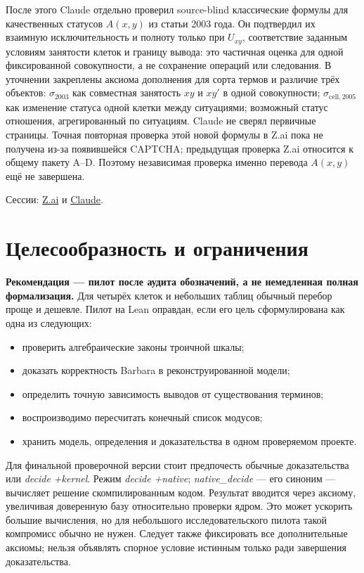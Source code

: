 \documentclass[12pt,a4paper]{article}
\begin{document}
После этого Claude отдельно проверил source-blind классические формулы для качественных статусов \(A(x,y)\) из статьи 2003 года. Он подтвердил их взаимную исключительность и полноту только при \(U_{xy}\), соответствие заданным условиям занятости клеток и границу вывода: это частичная оценка для одной фиксированной совокупности, а не сохранение операций или следования. В уточнении закреплены аксиома дополнения для сорта термов и различие трёх объектов: \(\sigma_{2003}\) как совместная занятость \(xy\) и \(xy'\) в одной совокупности; \(\sigma_{\mathrm{cell},2005}\) как изменение статуса одной клетки между ситуациями; возможный статус отношения, агрегированный по ситуациям. Claude не сверял первичные страницы. Точная повторная проверка этой новой формулы в Z.ai пока не получена из-за появившейся CAPTCHA; предыдущая проверка Z.ai относится к общему пакету A–D. Поэтому независимая проверка именно перевода \(A(x,y)\) ещё не завершена.

Сессии: \href{https://chat.z.ai/c/e506cdd5-91f0-44fc-8b5c-f7d122b6e616}{Z.ai} и \href{https://claude.ai/chat/e2e6111b-e341-4de3-8990-c0a07562e459}{Claude}.

\section{Целесообразность и ограничения}

\textbf{Рекомендация — пилот после аудита обозначений, а не немедленная полная формализация.} Для четырёх клеток и небольших таблиц обычный перебор проще и дешевле. Пилот на Lean оправдан, если его цель сформулирована как одна из следующих:

\begin{itemize}
\item проверить алгебраические законы троичной шкалы;
\item доказать корректность Barbara в реконструированной модели;
\item определить точную зависимость выводов от существования терминов;
\item воспроизводимо пересчитать конечный список модусов;
\item хранить модель, определения и доказательства в одном проверяемом проекте.
\end{itemize}
Для финальной проверочной версии стоит предпочесть обычные доказательства или \emph{decide +kernel}. Режим \emph{decide +native}; \emph{native\_decide} — его синоним — вычисляет решение скомпилированным кодом. Результат вводится через аксиому, увеличивая доверенную базу относительно проверки ядром. Это может ускорить большие вычисления, но для небольшого исследовательского пилота такой компромисс обычно не нужен. Следует также фиксировать все дополнительные аксиомы; нельзя объявлять спорное условие истинным только ради завершения доказательства.
\end{document}
